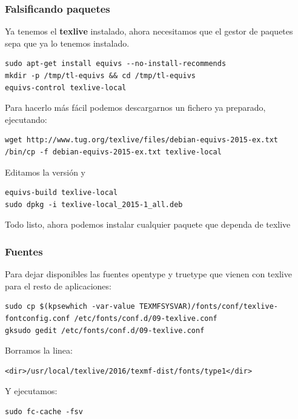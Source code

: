 \documentclass[12pt,spanish,]{article}
\begin{document}
\subsubsection{Falsificando paquetes}\label{falsificando-paquetes}

Ya tenemos el \textbf{texlive} instalado, ahora necesitamos que el
gestor de paquetes sepa que ya lo tenemos instalado.

\begin{verbatim}
sudo apt-get install equivs --no-install-recommends
mkdir -p /tmp/tl-equivs && cd /tmp/tl-equivs
equivs-control texlive-local
\end{verbatim}

Para hacerlo más fácil podemos descargarnos un fichero ya preparado,
ejecutando:

\begin{verbatim}
wget http://www.tug.org/texlive/files/debian-equivs-2015-ex.txt
/bin/cp -f debian-equivs-2015-ex.txt texlive-local
\end{verbatim}

Editamos la versión y

\begin{verbatim}
equivs-build texlive-local
sudo dpkg -i texlive-local_2015-1_all.deb
\end{verbatim}

Todo listo, ahora podemos instalar cualquier paquete que dependa de
texlive

\subsubsection{Fuentes}\label{fuentes}

Para dejar disponibles las fuentes opentype y truetype que vienen con
texlive para el resto de aplicaciones:

\begin{verbatim}
sudo cp $(kpsewhich -var-value TEXMFSYSVAR)/fonts/conf/texlive-fontconfig.conf /etc/fonts/conf.d/09-texlive.conf
gksudo gedit /etc/fonts/conf.d/09-texlive.conf
\end{verbatim}

Borramos la linea:

\begin{verbatim}
<dir>/usr/local/texlive/2016/texmf-dist/fonts/type1</dir>
\end{verbatim}

Y ejecutamos:

\begin{verbatim}
sudo fc-cache -fsv
\end{verbatim}
\end{document}
